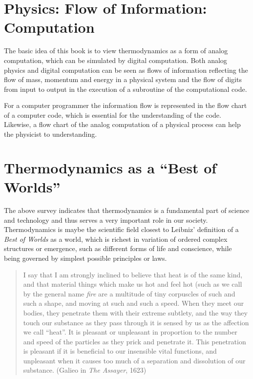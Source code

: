 \section{Physics: Flow of Information: Computation}

The basic idea of this book 
is to view thermodynamics as a form of 
analog computation, which can be simulated by digital computation. 
Both analog physics and digital computation can be seen as  
flows of information reflecting the flow of mass, momentum and 
energy in a physical system and the flow of digits from input to output in the
execution of a subroutine of the computational code.

For a computer programmer the information flow is 
represented in the flow chart of a computer code, which
is essential for the understanding of the code. 
Likewise, a flow chart of the analog computation 
of a physical process can help the physicist 
to understanding.



 
\section{Thermodynamics as a ``Best of  Worlds''}

The above survey indicates that thermodynamics 
is a fundamental part of science and
technology and thus serves a very important role in our society.
Thermodynamics is maybe the scientific field closest to 
Leibniz' definition of a \emph{Best of Worlds}
as a world, which is richest in variation of ordered complex
structures or emergence, such as different forms of life and conscience,
while being governed by simplest possible principles or laws.



\small
\begin{quote}I say that I am strongly inclined to believe that heat is of 
the same kind, and that material things which make us hot and feel hot 
(such as we call by the general name \emph{fire} are a multitude of tiny 
corpuscles of such and such a shape, and moving at such and such a speed. 
When they meet our bodies, they penetrate them with their extreme subtlety, 
and the way they touch our substance as they pass through it is sensed by 
us as the affection we call ``heat''. 
It is pleasant or unpleasant in 
proportion to the number and speed of the particles as they prick and 
penetrate it. This penetration is pleasant if it is beneficial to our 
insensible vital functions, and unpleasant when it causes too much of a 
separation and dissolution of our substance. (Galieo in \emph{The Assayer}, 
1623)
\end{quote}
\normalsize




